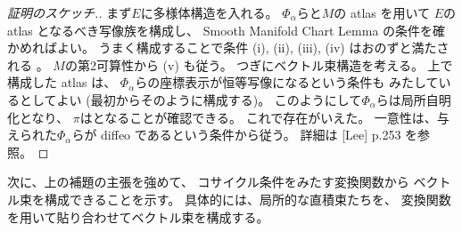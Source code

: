 \documentclass[report]{jlreq}
\begin{document}
\begin{proof}[証明のスケッチ.]
    まず$E$に多様体構造を入れる。
    $\Phi_\alpha$らと$M$の atlas を用いて
    $E$の atlas となるべき写像族を構成し、
    Smooth Manifold Chart Lemma の条件を確かめればよい。
    うまく構成することで条件 (i), (ii), (iii), (iv) はおのずと満たされる
    。
    $M$の第2可算性から (v) も従う。
    つぎにベクトル束構造を考える。
    上で構成した atlas は、
    $\Phi_\alpha$らの座標表示が恒等写像になるという条件も
    みたしているとしてよい (最初からそのように構成する)。
    このようにして$\Phi_\alpha$らは局所自明化となり、
    $\pi$は{\smooth}となることが確認できる。
    これで存在がいえた。
    一意性は、与えられた$\Phi_\alpha$らが
    diffeo であるという条件から従う。
    詳細は [Lee] p.253 を参照。
\end{proof}

次に、上の補題の主張を強めて、
コサイクル条件をみたす変換関数から
ベクトル束を構成できることを示す。
具体的には、局所的な直積束たちを、
変換関数を用いて貼り合わせてベクトル束を構成する。
\end{document}
